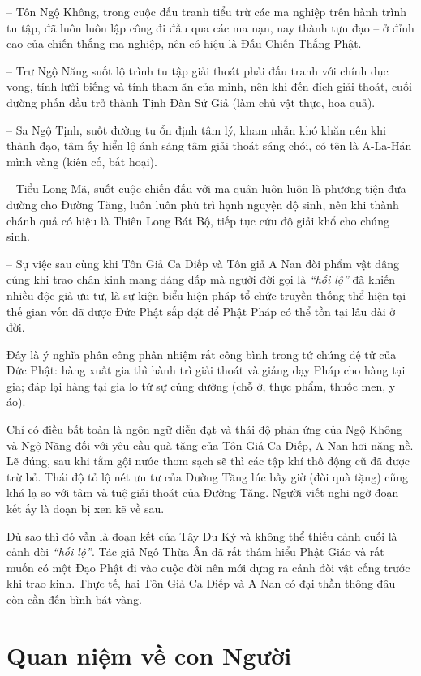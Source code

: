 -- Tôn Ngộ Không, trong cuộc đấu tranh tiểu trừ các ma nghiệp trên hành trình tu tập, đã luôn luôn lập công đi đầu qua các ma nạn, nay thành tựu đạo -- ở đỉnh cao của chiến thắng ma nghiệp, nên có hiệu là Đấu Chiến Thắng Phật.

-- Trư Ngộ Năng suốt lộ trình tu tập giải thoát phải đấu tranh với chính dục vọng, tính lười biếng và tính tham ăn của mình, nên khi đến đích giải thoát, cuối đường phấn đầu trở thành Tịnh Đàn Sứ Giả (làm chủ vật thực, hoa quả).

-- Sa Ngộ Tịnh, suốt đường tu ổn định tâm lý, kham nhẫn khó khăn nên khi thành đạo, tâm ấy hiển lộ ánh sáng tâm giải thoát sáng chói, có tên là A-La-Hán mình vàng (kiên cố, bất hoại).

-- Tiểu Long Mã, suốt cuộc chiến đấu với ma quân luôn luôn là phương tiện đưa đường cho Đường Tăng, luôn luôn phù trì hạnh nguyện độ sinh, nên khi thành chánh quả có hiệu là Thiên Long Bát Bộ, tiếp tục cứu độ giải khổ cho chúng sinh.

-- Sự việc sau cùng khi Tôn Giả Ca Diếp và Tôn giả A Nan đòi phẩm vật dâng cúng khi trao chân kinh mang dáng dấp mà người đời gọi là \emph{``hối lộ''} đã khiến nhiều độc giả ưu tư, là sự kiện biểu hiện pháp tổ chức truyền thống thể hiện tại thế gian vốn đã được Đức Phật sắp đặt để Phật Pháp có thể tồn tại lâu dài ở đời.

Đây là ý nghĩa phân công phân nhiệm rất công bình trong tứ chúng đệ tử của Đức Phật: hàng xuất gia thì hành trì giải thoát và giảng dạy Pháp cho hàng tại gia; đáp lại hàng tại gia lo tứ sự cúng dường (chỗ ở, thực phẩm, thuốc men, y áo).

Chỉ có điều bất toàn là ngôn ngữ diễn đạt và thái độ phản ứng của Ngộ Không và Ngộ Năng đối với yêu cầu quà tặng của Tôn Giả Ca Diếp, A Nan hơi nặng nề. Lẽ đúng, sau khi tắm gội nước thơm sạch sẽ thì các tập khí thô động cũ đã được trừ bỏ. Thái độ tỏ lộ nét ưu tư của Đường Tăng lúc bấy giờ (đòi quà tặng) cũng khá lạ so với tâm và tuệ giải thoát của Đường Tăng. Người viết nghi ngờ đoạn kết ấy là đoạn bị xen kẽ về sau.

Dù sao thì đó vẫn là đoạn kết của Tây Du Ký và không thể thiếu cảnh cuối là cảnh đòi \emph{``hối lộ''}. Tác giả Ngô Thừa Ân đã rất thâm hiểu Phật Giáo và rất muốn có một Đạo Phật đi vào cuộc đời nên mới dựng ra cảnh đòi vật cống trước khi trao kinh. Thực tế, hai Tôn Giả Ca Diếp và A Nan có đại thần thông đâu còn cần đến bình bát vàng.

\section{Quan niệm về con Người} %
\label{sec:98_99_100_con_nguoi}

